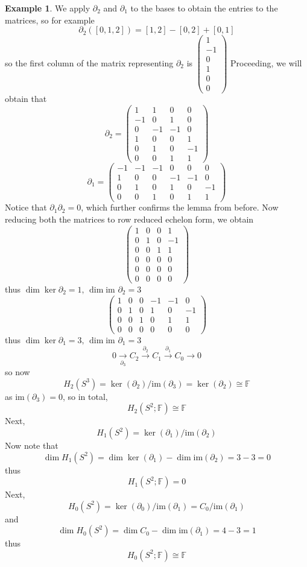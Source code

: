 \documentclass[a4paper,14pt]{extarticle}
\theoremstyle{definition}
\newtheorem*{eg}{Example}
\begin{document}
\begin{eg}
We apply $\partial_2$ and $\partial_1$ to the bases to obtain the entries to the matrices, so for example \[\partial_2([0,1,2])=[1,2]-[0,2]+[0,1]\] so the first column of the matrix representing 
$\partial_2$ is $\begin{pmatrix}1\\-1\\0\\1\\0\\0\end{pmatrix}$ Proceeding, we will obtain that
\[\partial_2=\begin{pmatrix}1&1&0&0\\-1&0&1&0\\0&-1&-1&0\\1&0&0&1\\0&1&0&-1\\0&0&1&1\end{pmatrix}\]
\[\partial_1=\begin{pmatrix}-1&-1&-1&0&0&0\\1&0&0&-1&-1&0\\0&1&0&1&0&-1\\0&0&1&0&1&1\end{pmatrix}\]
Notice that $\partial_1\partial_2=0$, which further confirms the lemma from before. Now reducing both the matrices to row reduced echelon form, we obtain
\[\begin{pmatrix}1&0&0&1\\0&1&0&-1\\0&0&1&1\\0&0&0&0\\0&0&0&0\\0&0&0&0\end{pmatrix}\] thus $\dim\ker\partial_2=1,\,\dim\text{im }\partial_2=3$
\[\begin{pmatrix}1&0&0&-1&-1&0\\0&1&0&1&0&-1\\0&0&1&0&1&1\\0&0&0&0&0&0\end{pmatrix}\] thus $\dim\ker\partial_1=3,\,\dim\text{im }\partial_1=3$
\[0\xrightarrow[\partial_3]{} C_2\xrightarrow{\partial_2}C_1\xrightarrow{\partial_1} C_0\rightarrow0\]
so now \[H_2(S^3)=\ker(\partial_2)/\text{im}(\partial_3)=\ker(\partial_2)\cong\mathbb{F}\] as $\text{im}(\partial_3)=0$, so in total, \[H_2(S^2;\mathbb{F})\cong\mathbb{F}\] Next,
\[H_1(S^2)=\ker(\partial_1)/\text{im}(\partial_2)\] Now note that \[\dim H_1(S^2)=\dim\ker(\partial_1)-\dim\text{im}(\partial_2)=3-3=0\] thus \[H_1(S^2;\mathbb{F})=0\] Next,
\[H_0(S^2)=\ker(\partial_0)/\text{im}(\partial_1)=C_0/\text{im}(\partial_1)\] and \[\dim H_0(S^2)=\dim C_0-\dim\text{im}(\partial_1)=4-3=1\] thus \[H_0(S^2;\mathbb{F})\cong\mathbb{F}\]
\end{eg}
\end{document}
